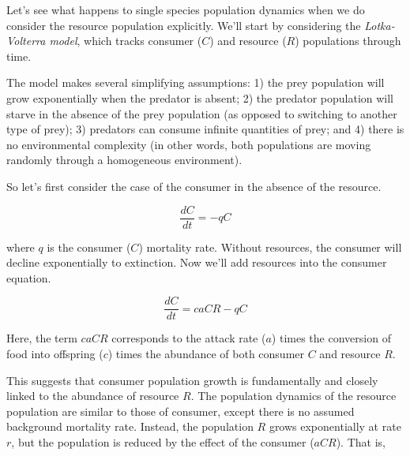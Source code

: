 \documentclass[12pt]{article}
\begin{document}
Let's see what happens to single species population dynamics when we do consider the resource population explicitly. We'll start by considering the \textit{Lotka-Volterra model}, which tracks consumer ($C$) and resource ($R$) populations through time. 


The model makes several simplifying assumptions: 1) the prey population will grow exponentially when the predator is absent; 2) the predator population will starve in the absence of the prey population (as opposed to switching to another type of prey); 3) predators can consume infinite quantities of prey; and 4) there is no environmental complexity (in other words, both populations are moving randomly through a homogeneous environment).


So let's first consider the case of the consumer in the absence of the resource. 

\begin{equation}
\frac{dC}{dt} = -qC
\end{equation}

where $q$ is the consumer ($C$) mortality rate. Without resources, the consumer will decline exponentially to extinction. Now we'll add resources into the consumer equation.


\begin{equation}
\frac{dC}{dt} = caCR - qC
\end{equation}



Here, the term $caCR$ corresponds to the attack rate ($a$) times the conversion of food into offspring ($c$) times the abundance of both consumer $C$ and resource $R$. \\



\bigskip

\noindent{}
\bigskip





This suggests that consumer population growth is fundamentally and closely linked to the abundance of resource $R$. The population dynamics of the resource population are similar to those of consumer, except there is no assumed background mortality rate. Instead, the population $R$ grows exponentially at rate $r$, but the population is reduced by the effect of the consumer ($aCR$). That is, 
\end{document}
